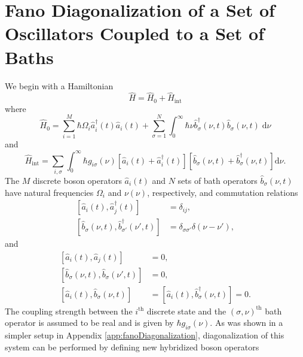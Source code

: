 
\section{Fano Diagonalization of a Set of Oscillators Coupled to a Set of Baths}\label{app:fanoDiagonalizationManyModes}

We begin with a Hamiltonian
\begin{equation}\label{eq:HmanyModes}
\hat{H} = \hat{H}_0 + \hat{H}_\mathrm{int}
\end{equation}
where 
\begin{equation}
\hat{H}_0 = \sum_{i = 1}^{M}\hbar\Omega_i\hat{a}_{i}^\dagger(t)\hat{a}_{i}(t) + \sum_{\sigma = 1}^N\int_0^\infty\hbar\nu \hat{b}_\sigma^\dagger(\nu,t)\hat{b}_\sigma(\nu,t)\;\mathrm{d}\nu
\end{equation}
and
\begin{equation}
\hat{H}_\mathrm{int} = \sum_{i,\sigma}\int_0^\infty\hbar g_{i \sigma}(\nu)\left[\hat{a}_{i}(t) + \hat{a}_{i}^\dagger(t)\right]\left[\hat{b}_\sigma(\nu,t) + \hat{b}_\sigma^\dagger(\nu,t)\right]\mathrm{d}\nu.
\end{equation}
The $M$ discrete boson operators $\hat{a}_i(t)$ and $N$ sets of bath operators $\hat{b}_\sigma(\nu,t)$ have natural frequencies $\Omega_i$ and $\nu (\nu)$, respectively, and commutation relations
\begin{equation}
\begin{split}
\left[\hat{a}_i(t),\hat{a}_{j}^\dagger(t)\right] &= \delta_{ij},\\
\left[\hat{b}_\sigma(\nu,t),\hat{b}_{\sigma'}^\dagger(\nu',t)\right] &= \delta_{\sigma\sigma'}\delta(\nu - \nu'),
\end{split}
\end{equation}
and
\begin{equation}
\begin{split}
\left[\hat{a}_i(t),\hat{a}_{j}(t)\right] &= 0,\\
\left[\hat{b}_\sigma(\nu,t),\hat{b}_\sigma(\nu',t)\right] &= 0,\\
\left[\hat{a}_i(t),\hat{b}_\sigma(\nu,t)\right] &= \left[\hat{a}_i(t),\hat{b}_\sigma^\dagger(\nu,t)\right] = 0.
\end{split}
\end{equation}
The coupling strength between the $i^\mathrm{th}$ discrete state and the $(\sigma,\nu)^\mathrm{th}$ bath operator is assumed to be real and is given by $\hbar g_{i\sigma}(\nu)$. As was shown in a simpler setup in Appendix \ref{app:fanoDiagonalization}, diagonalization of this system can be performed by defining new hybridized boson operators
